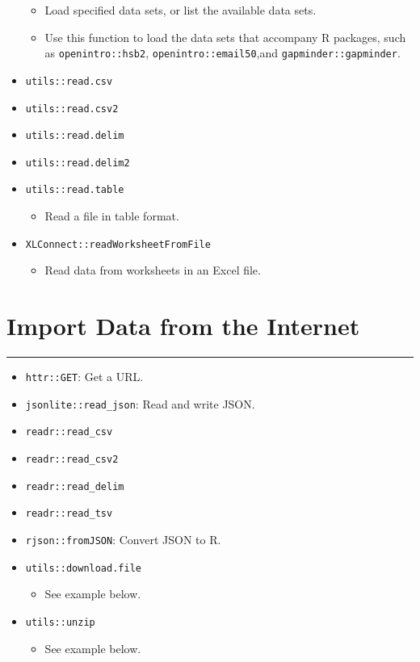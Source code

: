 \documentclass[
]{book}
\providecommand{\tightlist}{%
  \setlength{\itemsep}{0pt}\setlength{\parskip}{0pt}}
\begin{document}
\begin{itemize}
  \begin{itemize}
  \tightlist
  \item
    Load specified data sets, or list the available data sets.
  \item
    Use this function to load the data sets that accompany R packages, such as \texttt{openintro::hsb2}, \texttt{openintro::email50},and \texttt{gapminder::gapminder}.
  \end{itemize}
\item
  \texttt{utils::read.csv}
\item
  \texttt{utils::read.csv2}
\item
  \texttt{utils::read.delim}
\item
  \texttt{utils::read.delim2}
\item
  \texttt{utils::read.table}

  \begin{itemize}
  \tightlist
  \item
    Read a file in table format.
  \end{itemize}
\item
  \texttt{XLConnect::readWorksheetFromFile}

  \begin{itemize}
  \tightlist
  \item
    Read data from worksheets in an Excel file.
  \end{itemize}
\end{itemize}

\hypertarget{import-data-from-the-internet}{%
\section{Import Data from the Internet}\label{import-data-from-the-internet}}

\begin{center}\rule{0.5\linewidth}{0.5pt}\end{center}

\begin{itemize}
\tightlist
\item
  \texttt{httr::GET}: Get a URL.
\item
  \texttt{jsonlite::read\_json}: Read and write JSON.
\item
  \texttt{readr::read\_csv}
\item
  \texttt{readr::read\_csv2}
\item
  \texttt{readr::read\_delim}
\item
  \texttt{readr::read\_tsv}
\item
  \texttt{rjson::fromJSON}: Convert JSON to R.
\item
  \texttt{utils::download.file}

  \begin{itemize}
  \tightlist
  \item
    See example below.
  \end{itemize}
\item
  \texttt{utils::unzip}

  \begin{itemize}
  \tightlist
  \item
    See example below.
  \end{itemize}
\end{itemize}
\end{document}
